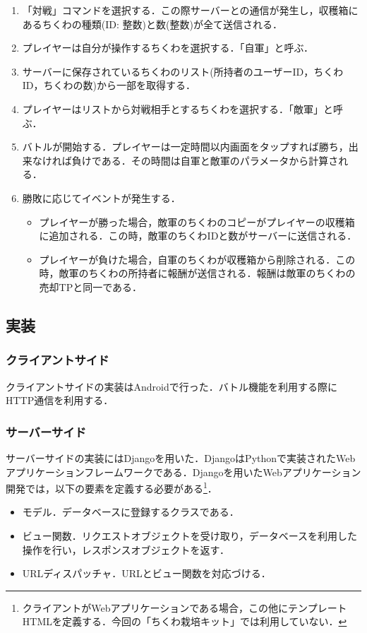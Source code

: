 \documentclass[a4paper,11pt]{jsarticle}
\begin{document}
\begin{enumerate}
\item
「対戦」コマンドを選択する．この際サーバーとの通信が発生し，収穫箱にあるちくわの種類(ID: 整数)と数(整数)が全て送信される．
\item
プレイヤーは自分が操作するちくわを選択する．「自軍」と呼ぶ．
\item
サーバーに保存されているちくわのリスト(所持者のユーザーID，ちくわID，ちくわの数)から一部を取得する．
\item
プレイヤーはリストから対戦相手とするちくわを選択する．「敵軍」と呼ぶ．
\item
バトルが開始する．プレイヤーは一定時間以内画面をタップすれば勝ち，出来なければ負けである．その時間は自軍と敵軍のパラメータから計算される．
\item
勝敗に応じてイベントが発生する．
\begin{itemize}
\item
プレイヤーが勝った場合，敵軍のちくわのコピーがプレイヤーの収穫箱に追加される．この時，敵軍のちくわIDと数がサーバーに送信される．
\item
プレイヤーが負けた場合，自軍のちくわが収穫箱から削除される．この時，敵軍のちくわの所持者に報酬が送信される．報酬は敵軍のちくわの売却TPと同一である．
\end{itemize}
\end{enumerate}


\subsection{実装}
\subsubsection{クライアントサイド}
クライアントサイドの実装はAndroidで行った．バトル機能を利用する際にHTTP通信を利用する．

\subsubsection{サーバーサイド}
サーバーサイドの実装にはDjango\cite{django}を用いた．DjangoはPython\cite{python}で実装されたWebアプリケーションフレームワークである．Djangoを用いたWebアプリケーション開発では，以下の要素を定義する必要がある\footnote{クライアントがWebアプリケーションである場合，この他にテンプレートHTMLを定義する．今回の「ちくわ栽培キット」では利用していない．}．

\begin{itemize}
\item
モデル．データベースに登録するクラスである．
\item
ビュー関数．リクエストオブジェクトを受け取り，データベースを利用した操作を行い，レスポンスオブジェクトを返す．
\item
URLディスパッチャ．URLとビュー関数を対応づける．
\end{itemize}
\end{document}
